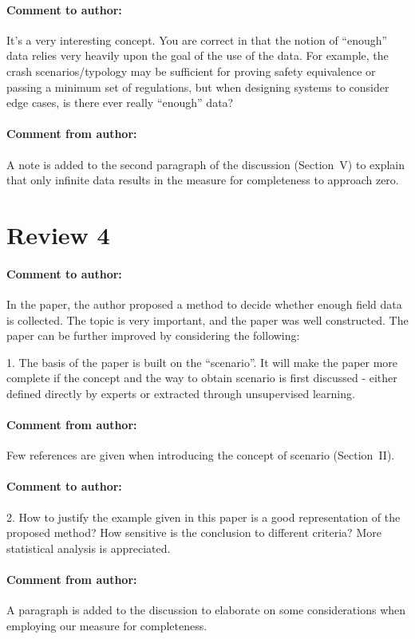 \documentclass[10pt,final,a4paper,oneside,onecolumn]{article}
\newcommand{\toauthor}{\paragraph*{Comment to author:}}
\newcommand{\fromauthor}{\paragraph*{Comment from author:}}
\begin{document}
\toauthor It's a very interesting concept. You are correct in that the notion of ``enough'' data relies very heavily upon the goal of the use of the data. For example, the crash scenarios/typology may be sufficient for proving safety equivalence or passing a minimum set of regulations, but when designing systems to consider edge cases, is there ever really ``enough'' data? 

\fromauthor A note is added to the second paragraph of the discussion (Section~V) to explain that only infinite data results in the measure for completeness to approach zero.

\section*{Review 4}

\toauthor In the paper, the author proposed a method to decide whether enough field data is collected. The topic is very important, and the paper was well constructed. The paper can be further improved by considering the following:

1. The basis of the paper is built on the ``scenario''. It will make the paper more complete if the concept and the way to obtain scenario is first discussed - either defined directly by experts or extracted through unsupervised learning.

\fromauthor Few references are given when introducing the concept of scenario (Section~II).

\toauthor 2. How to justify the example given in this paper is a good representation of the proposed method? How sensitive is the conclusion to different criteria? More statistical analysis is appreciated.

\fromauthor A paragraph is added to the discussion to elaborate on some considerations when employing our measure for completeness. 
\end{document}
